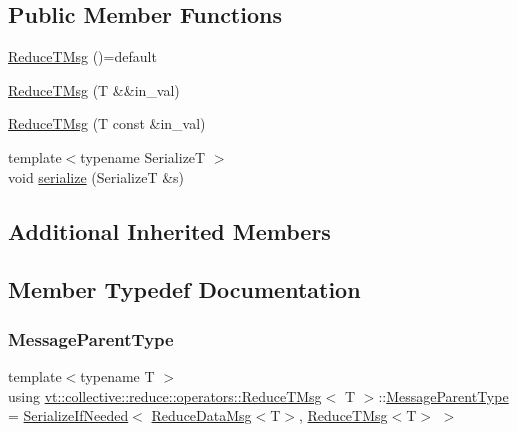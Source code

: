\subsection*{Public Member Functions}
\begin{DoxyCompactItemize}
\item 
\hyperlink{structvt_1_1collective_1_1reduce_1_1operators_1_1_reduce_t_msg_ab7705a9ce2e1c1702021fa2e79b81493}{Reduce\+T\+Msg} ()=default
\item 
\hyperlink{structvt_1_1collective_1_1reduce_1_1operators_1_1_reduce_t_msg_aae2e0c70e1fd0b3552758ae973bed555}{Reduce\+T\+Msg} (T \&\&in\+\_\+val)
\item 
\hyperlink{structvt_1_1collective_1_1reduce_1_1operators_1_1_reduce_t_msg_adf385a9e59ac02aa23ae173b89a6c075}{Reduce\+T\+Msg} (T const \&in\+\_\+val)
\item 
{\footnotesize template$<$typename SerializeT $>$ }\\void \hyperlink{structvt_1_1collective_1_1reduce_1_1operators_1_1_reduce_t_msg_a00e2a6db0204015f48c57685e8aa8beb}{serialize} (SerializeT \&s)
\end{DoxyCompactItemize}
\subsection*{Additional Inherited Members}


\subsection{Member Typedef Documentation}
\mbox{\label{structvt_1_1collective_1_1reduce_1_1operators_1_1_reduce_t_msg_a0dd12197060e03bb7e73dbe299044f22}} 
\subsubsection{\texorpdfstring{Message\+Parent\+Type}{MessageParentType}}
{\footnotesize\ttfamily template$<$typename T $>$ \\
using \hyperlink{structvt_1_1collective_1_1reduce_1_1operators_1_1_reduce_t_msg}{vt\+::collective\+::reduce\+::operators\+::\+Reduce\+T\+Msg}$<$ T $>$\+::\hyperlink{structvt_1_1collective_1_1reduce_1_1operators_1_1_reduce_t_msg_a0dd12197060e03bb7e73dbe299044f22}{Message\+Parent\+Type} =  \hyperlink{namespacevt_a0a4ad8c256fcffa564e9fa7800e4b495}{Serialize\+If\+Needed}$<$ \hyperlink{structvt_1_1collective_1_1reduce_1_1operators_1_1_reduce_data_msg}{Reduce\+Data\+Msg}$<$T$>$, \hyperlink{structvt_1_1collective_1_1reduce_1_1operators_1_1_reduce_t_msg}{Reduce\+T\+Msg}$<$T$>$ $>$}




